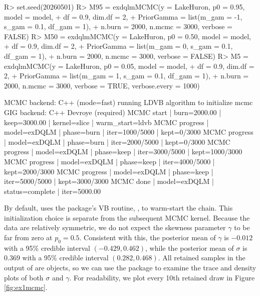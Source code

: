 \documentclass[jss]{jss}
\begin{document}
\begin{CodeChunk}
\begin{CodeInput}
R> set.seed(20260501)
R> M95 = exdqlmMCMC(y = LakeHuron, p0 = 0.95, model = model,
+                 df = 0.9, dim.df = 2,
+                 PriorGamma = list(m_gam = -1, s_gam = 0.1, df_gam = 1),
+                 n.burn = 2000, n.mcmc = 3000, verbose = FALSE)
R> M50 = exdqlmMCMC(y = LakeHuron, p0 = 0.50, model = model,
+                  df = 0.9, dim.df = 2,
+                  PriorGamma = list(m_gam = 0, s_gam = 0.1, df_gam = 1),
+                  n.burn = 2000, n.mcmc = 3000, verbose = FALSE)
R> M5 = exdqlmMCMC(y = LakeHuron, p0 = 0.05, model = model,
+                 df = 0.9, dim.df = 2,
+                 PriorGamma = list(m_gam = 1, s_gam = 0.1, df_gam = 1),
+                 n.burn = 2000, n.mcmc = 3000, verbose = TRUE, verbose.every = 1000)
\end{CodeInput}

\begin{CodeOutput}
MCMC backend: C++ (mode=fast)
running LDVB algorithm to initialize mcmc
GIG backend: C++ Devroye (required)
MCMC start | burn=2000.00 | keep=3000.00 | kernel=slice | warm_start=ldvb 
MCMC progress | model=exDQLM | phase=burn | iter=1000/5000 | kept=0/3000 
MCMC progress | model=exDQLM | phase=burn | iter=2000/5000 | kept=0/3000 
MCMC progress | model=exDQLM | phase=keep | iter=3000/5000 | kept=1000/3000 
MCMC progress | model=exDQLM | phase=keep | iter=4000/5000 | kept=2000/3000 
MCMC progress | model=exDQLM | phase=keep | iter=5000/5000 | kept=3000/3000 
MCMC done | model=exDQLM | status=complete | iter=5000.00
\end{CodeOutput}
\end{CodeChunk}

By default,  uses the package's VB routine, , to warm-start the chain. This initialization choice is separate from the subsequent MCMC kernel. Because the data are relatively symmetric, we do not expect the skewness parameter \(\gamma\) to be far from zero at \(p_0 = 0.5\). Consistent with this, the posterior mean of \(\gamma\) is \(-0.012\) with a 95\% credible interval \((-0.429, 0.462)\), while the posterior mean of \(\sigma\) is \(0.369\) with a 95\% credible interval \((0.282, 0.468)\). All retained samples in the output of  are  objects, so we can use the package  to examine the trace and density plots of both \(\sigma\) and \(\gamma\). For readability, we plot every 10th retained draw in Figure \ref{fig:ex1mcmc}.
\end{document}
